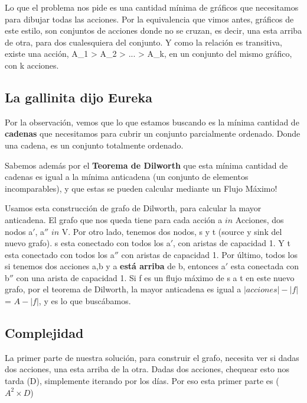 \par{Lo que el problema nos pide es una cantidad mínima de gráficos que necesitamos para dibujar todas las acciones. 
Por la equivalencia que vimos antes, gráficos de este estilo, son conjuntos de acciones donde no se cruzan, es decir, 
una esta arriba de otra, para dos cualesquiera del conjunto. Y como la relación es transitiva, existe una acción,
A_1 > A_2 > ... > A_k, en un conjunto del mismo gráfico, con k acciones.} 

\subsection{La gallinita dijo Eureka}

\par{Por la observación, vemos que lo que estamos buscando es la mínima cantidad de \textbf{cadenas} que necesitamos
para cubrir un conjunto parcialmente ordenado. Donde una cadena, es un conjunto totalmente ordenado.}

\par{Sabemos además por el \textbf{Teorema de Dilworth} que esta mínima cantidad de cadenas es igual a la mínima anticadena
(un conjunto de elementos incomparables), y que estas se pueden calcular mediante un Flujo Máximo!}

\par{Usamos esta construcción de grafo de Dilworth, para calcular la mayor anticadena. El grafo que nos queda 
tiene para cada acción a $in$ Acciones, dos nodos a$'$, a$''$ $in$ V. Por otro lado, tenemos dos nodos, s y t (source y sink del nuevo grafo).
s esta conectado con todos los a$'$, con aristas de capacidad 1. Y t esta conectado con todos los a$''$ con aristas de capacidad 1.
Por último, todos los si tenemos dos acciones a,b y a \textbf{está arriba} de b, entonces a$'$ esta conectada con b$''$ con una arista de capacidad 1.
Si f es un flujo máximo de s a t en este nuevo grafo, por el teorema de Dilworth, la mayor anticadena es igual a $|acciones| - |f|$ = $A - |f|$, y es lo que buscábamos.  
}

\subsection{Complejidad}

\par{La primer parte de nuestra solución, para construir el grafo, necesita ver si dadas dos acciones, 
una esta arriba de la otra. Dadas dos acciones, chequear esto nos tarda \bigo(D), simplemente iterando por los días.
Por eso esta primer parte es \bigo($A^2 \times D $)}

